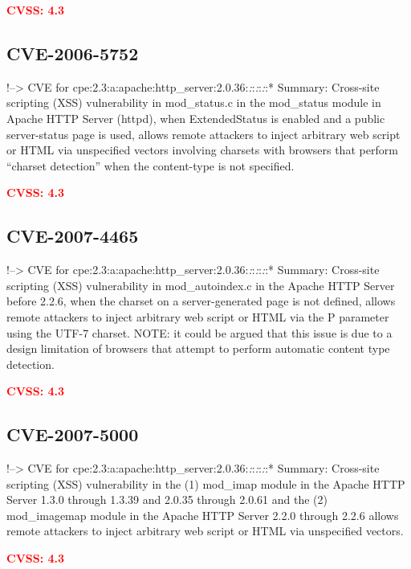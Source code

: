 \documentclass[a4paper, 12pt]{article}
\begin{document}
\textbf{\textcolor{red}{CVSS: 4.3}}

\hypertarget{cve-2006-5752}{%
\subsection{CVE-2006-5752}\label{cve-2006-5752}}

!--\textgreater{} CVE for
cpe:2.3:a:apache:http\_server:2.0.36:\emph{:}:\emph{:}:\emph{:}:*
Summary: Cross-site scripting (XSS) vulnerability in mod\_status.c in
the mod\_status module in Apache HTTP Server (httpd), when
ExtendedStatus is enabled and a public server-status page is used,
allows remote attackers to inject arbitrary web script or HTML via
unspecified vectors involving charsets with browsers that perform
``charset detection'' when the content-type is not specified.

\textbf{\textcolor{red}{CVSS: 4.3}}

\hypertarget{cve-2007-4465}{%
\subsection{CVE-2007-4465}\label{cve-2007-4465}}

!--\textgreater{} CVE for
cpe:2.3:a:apache:http\_server:2.0.36:\emph{:}:\emph{:}:\emph{:}:*
Summary: Cross-site scripting (XSS) vulnerability in mod\_autoindex.c in
the Apache HTTP Server before 2.2.6, when the charset on a
server-generated page is not defined, allows remote attackers to inject
arbitrary web script or HTML via the P parameter using the UTF-7
charset. NOTE: it could be argued that this issue is due to a design
limitation of browsers that attempt to perform automatic content type
detection.

\textbf{\textcolor{red}{CVSS: 4.3}}

\hypertarget{cve-2007-5000}{%
\subsection{CVE-2007-5000}\label{cve-2007-5000}}

!--\textgreater{} CVE for
cpe:2.3:a:apache:http\_server:2.0.36:\emph{:}:\emph{:}:\emph{:}:*
Summary: Cross-site scripting (XSS) vulnerability in the (1) mod\_imap
module in the Apache HTTP Server 1.3.0 through 1.3.39 and 2.0.35 through
2.0.61 and the (2) mod\_imagemap module in the Apache HTTP Server 2.2.0
through 2.2.6 allows remote attackers to inject arbitrary web script or
HTML via unspecified vectors.

\textbf{\textcolor{red}{CVSS: 4.3}}
\end{document}
